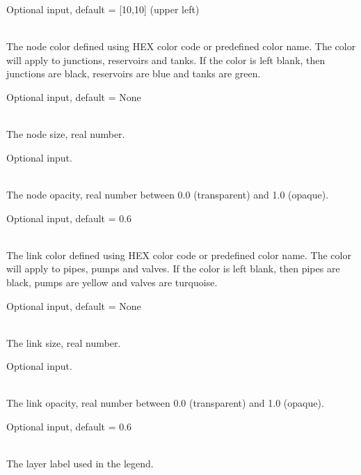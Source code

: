 \begin{description}[topsep=0pt,parsep=0.5em,itemsep=-0.4em]
\begin{description}[topsep=0pt,parsep=0.5em,itemsep=-0.4em]
\begin{description}[topsep=0pt,parsep=0.5em,itemsep=-0.4em]
                Optional input, default = [10,10] (upper left)
    \end{description}
    \item[{nodes}]\hfill
    \begin{description}[topsep=0pt,parsep=0.5em,itemsep=-0.4em]
      \item[{color}]\hfill
\\The node color defined using HEX color code or predefined color name.
                The color will apply to junctions, reservoirs and tanks. If the 
                color is left blank, then junctions are black, reservoirs are 
                blue and tanks are green.
                
                Optional input, default = None
      \item[{size}]\hfill
\\The node size, real number.
                
                Optional input.
      \item[{opacity}]\hfill
\\The node opacity, real number between 0.0 (transparent) and 1.0 (opaque).
                
                Optional input, default = 0.6
    \end{description}
    \item[{links}]\hfill
    \begin{description}[topsep=0pt,parsep=0.5em,itemsep=-0.4em]
      \item[{color}]\hfill
\\The link color defined using HEX color code or predefined color name.
                The color will apply to pipes, pumps and valves. If the 
                color is left blank, then pipes are black, pumps are 
                yellow and valves are turquoise.
                
                Optional input, default = None
      \item[{size}]\hfill
\\The link size, real number.
                
                Optional input.
      \item[{opacity}]\hfill
\\The link opacity, real number between 0.0 (transparent) and 1.0 (opaque).
                
                Optional input, default = 0.6
    \end{description}
    \item[{layers}]\hfill
    \begin{description}[topsep=0pt,parsep=0.5em,itemsep=-0.4em]
      \item[{label}]\hfill
\\The layer label used in the legend. 
                

\end{description}
\end{description}
\end{description}
